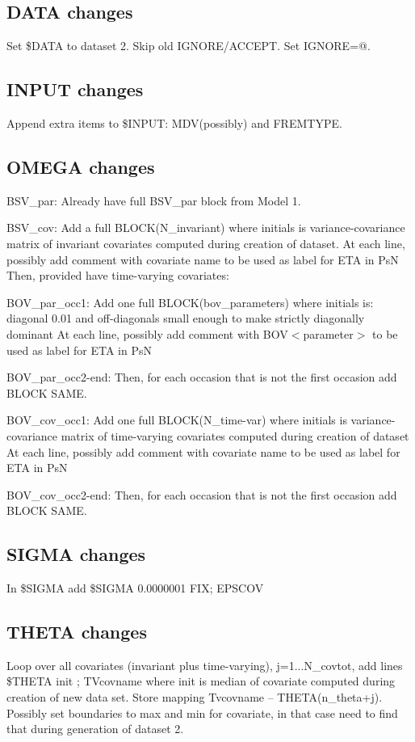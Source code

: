 \subsection{DATA changes}
Set \$DATA to dataset 2. Skip old IGNORE/ACCEPT. Set IGNORE=@.

\subsection{INPUT changes}
Append extra items to \$INPUT: MDV(possibly) and FREMTYPE.

\subsection{OMEGA changes}
BSV\_par: Already have full BSV\_par block from Model 1.

BSV\_cov: Add a full BLOCK(N\_invariant) where initials is variance-covariance matrix of invariant covariates computed during creation of dataset.
At each line, possibly add comment with covariate name to be used as label for ETA in PsN
Then, provided have time-varying covariates:

BOV\_par\_occ1: Add one full BLOCK(bov\_parameters) where initials is: diagonal 0.01 and off-diagonals small enough to make strictly diagonally dominant
At each line, possibly add comment with BOV$<$parameter$>$ to be used as label for ETA in PsN

BOV\_par\_occ2-end: Then, for each occasion that is not the first occasion add BLOCK SAME.

BOV\_cov\_occ1: Add one full BLOCK(N\_time-var) where initials is variance-covariance matrix of time-varying covariates computed during creation of dataset
At each line, possibly add comment with covariate name to be used as label for ETA in PsN

BOV\_cov\_occ2-end: Then, for each occasion that is not the first occasion add BLOCK SAME.

\subsection{SIGMA changes}
In \$SIGMA add 
\$SIGMA 0.0000001 FIX; EPSCOV

\subsection{THETA changes}
Loop over all covariates (invariant plus time-varying), j=1...N\_covtot, add lines
\$THETA init ; TVcovname
where init is median of covariate computed during creation of new data set. Store mapping Tvcovname – THETA(n\_theta+j). Possibly set boundaries to max and min for covariate, in that case need to find that during generation of dataset 2.

